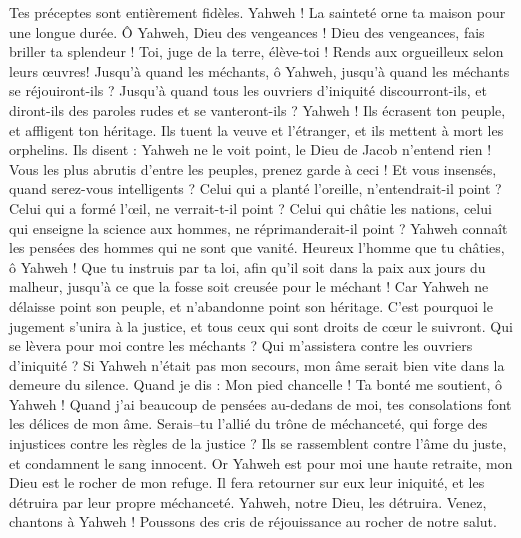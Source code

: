 \begin{multicols}{2}
Tes préceptes sont entièrement fidèles. Yahweh ! La sainteté orne ta maison pour une longue durée.
\VerseOne{}Ô Yahweh, Dieu des vengeances ! Dieu des vengeances, fais briller ta splendeur !
Toi, juge de la terre, élève-toi ! Rends aux orgueilleux selon leurs œuvres!
Jusqu'à quand les méchants, ô Yahweh, jusqu'à quand les méchants se réjouiront-ils ?
Jusqu'à quand tous les ouvriers d'iniquité discourront-ils, et diront-ils des paroles rudes et se vanteront-ils ?
Yahweh ! Ils écrasent ton peuple, et affligent ton héritage.
Ils tuent la veuve et l'étranger, et ils mettent à mort les orphelins.
Ils disent : Yahweh ne le voit point, le Dieu de Jacob n'entend rien !
Vous les plus abrutis d'entre les peuples, prenez garde à ceci ! Et vous insensés, quand serez-vous intelligents ?
Celui qui a planté l'oreille, n'entendrait-il point ? Celui qui a formé l'œil, ne verrait-t-il point ?
Celui qui châtie les nations, celui qui enseigne la science aux hommes, ne réprimanderait-il point ?
Yahweh connaît les pensées des hommes qui ne sont que vanité.
Heureux l'homme que tu châties, ô Yahweh ! Que tu instruis par ta loi,
afin qu'il soit dans la paix aux jours du malheur, jusqu'à ce que la fosse soit creusée pour le méchant !
Car Yahweh ne délaisse point son peuple, et n'abandonne point son héritage.
C'est pourquoi le jugement s'unira à la justice, et tous ceux qui sont droits de cœur le suivront.
Qui se lèvera pour moi contre les méchants ? Qui m'assistera contre les ouvriers d'iniquité ?
Si Yahweh n'était pas mon secours, mon âme serait bien vite dans la demeure du silence.
Quand je dis : Mon pied chancelle ! Ta bonté me soutient, ô Yahweh !
Quand j'ai beaucoup de pensées au-dedans de moi, tes consolations font les délices de mon âme.
Serais–tu l'allié du trône de méchanceté, qui forge des injustices contre les règles de la justice ?
Ils se rassemblent contre l'âme du juste, et condamnent le sang innocent.
Or Yahweh est pour moi une haute retraite, mon Dieu est le rocher de mon refuge.
Il fera retourner sur eux leur iniquité, et les détruira par leur propre méchanceté. Yahweh, notre Dieu, les détruira.
\VerseOne{}Venez, chantons à Yahweh ! Poussons des cris de réjouissance au rocher de notre salut.

\end{multicols}
